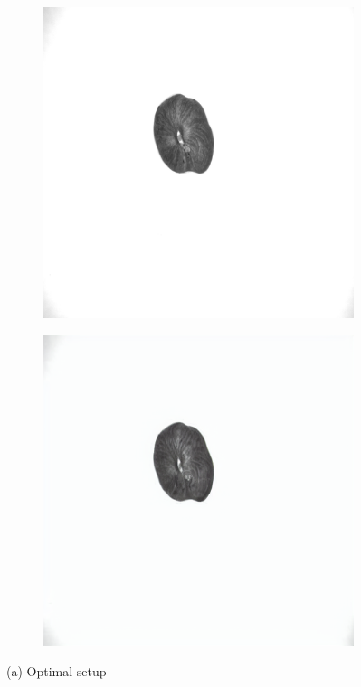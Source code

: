 \documentclass[12pt,DIV14,BCOR12mm,a4paper,footinclude=false,headinclude,parskip=half-,twoside,openright,cleardoublepage=empty,toc=index,bibliography=totoc,listof=totoc]{scrreprt}
\numberwithin{equation}{chapter}
\begin{document}
\begin{figure}
    \centering

    \begin{subfigure}[t]{0.24\textwidth}
        \centering
        \includegraphics[width=\textwidth]{../media/diff_nuts_optimal_real.png}
    \end{subfigure}%
    \hspace{0.02\textwidth}
    \begin{subfigure}[t]{0.24\textwidth}
        \centering
        \includegraphics[width=\textwidth]{../media/diff_nuts_optimal_fake.png}
    \end{subfigure}
    \caption*{(a) Optimal setup}


\end{figure}
\end{document}
